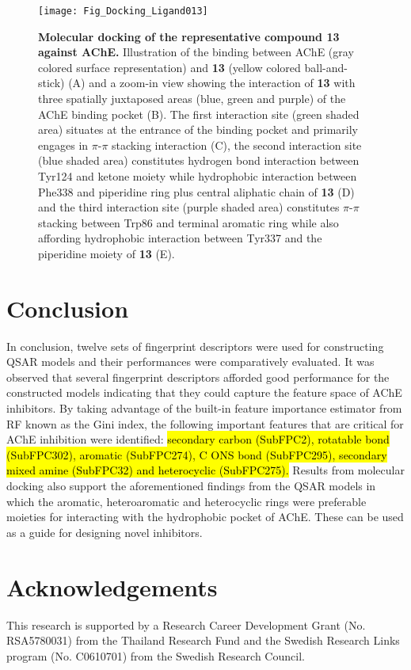 \documentclass[fleqn,10pt]{wlpeerj}
\begin{document}
\begin{figure}[!t]
\centering
\texttt{[image: Fig\_Docking\_Ligand013]}
\caption{\textbf{Molecular docking of the representative compound 13 against AChE.} Illustration of the binding between AChE (gray colored surface representation) and \textbf{13} (yellow colored ball-and-stick) (A) and a zoom-in view showing the interaction of \textbf{13} with three spatially juxtaposed areas (blue, green and purple) of the AChE binding pocket (B). The first interaction site (green shaded area) situates at the entrance of the binding pocket and primarily engages in $\pi$-$\pi$ stacking interaction (C), the second interaction site (blue shaded area) constitutes hydrogen bond interaction between Tyr124 and ketone moiety while hydrophobic interaction between Phe338 and piperidine ring plus central aliphatic chain of \textbf{13} (D) and the third interaction site (purple shaded area) constitutes $\pi$-$\pi$ stacking between Trp86 and terminal aromatic ring while also affording hydrophobic interaction between Tyr337 and the piperidine moiety of \textbf{13} (E).} 
\label{fig:docking_ligand013}
\end{figure}


\FloatBarrier

\section*{Conclusion}

In conclusion, twelve sets of fingerprint descriptors were used for constructing QSAR models and their performances were comparatively evaluated. It was observed that several fingerprint descriptors afforded good performance for the constructed models indicating that they could capture the feature space of AChE inhibitors. By taking advantage of the built-in feature importance estimator from RF known as the Gini index, the following important features that are critical for AChE inhibition were identified: \hl{secondary carbon (SubFPC2), rotatable bond (SubFPC302), aromatic (SubFPC274), C ONS bond (SubFPC295), secondary mixed amine (SubFPC32) and heterocyclic (SubFPC275).} Results from molecular docking also support the aforementioned findings from the QSAR models in which the aromatic, heteroaromatic and heterocyclic rings were preferable moieties for interacting with the hydrophobic pocket of AChE. These can be used as a guide for designing novel inhibitors. 


\section*{Acknowledgements}
This research is supported by a Research Career Development Grant (No. RSA5780031) from the Thailand Research Fund and the Swedish Research Links program (No. C0610701) from the Swedish Research Council.



\end{document}
